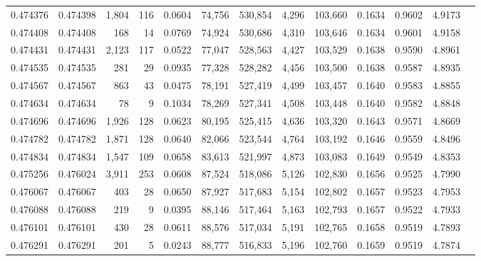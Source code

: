 \begin{tabular}{rrrrrrrrrrrrr}
0.474376 & 0.474398 & 1,804 &   116 &                                     0.0604 &  74,756 & 530,854 &   4,296 & 103,660 & 0.1634 & 0.9602 & 4.9173 \\
0.474408 & 0.474408 &   168 &    14 &                                     0.0769 &  74,924 & 530,686 &   4,310 & 103,646 & 0.1634 & 0.9601 & 4.9158 \\
0.474431 & 0.474431 & 2,123 &   117 &                                     0.0522 &  77,047 & 528,563 &   4,427 & 103,529 & 0.1638 & 0.9590 & 4.8961 \\
0.474535 & 0.474535 &   281 &    29 &                                     0.0935 &  77,328 & 528,282 &   4,456 & 103,500 & 0.1638 & 0.9587 & 4.8935 \\
0.474567 & 0.474567 &   863 &    43 &                                     0.0475 &  78,191 & 527,419 &   4,499 & 103,457 & 0.1640 & 0.9583 & 4.8855 \\
0.474634 & 0.474634 &    78 &     9 &                                     0.1034 &  78,269 & 527,341 &   4,508 & 103,448 & 0.1640 & 0.9582 & 4.8848 \\
0.474696 & 0.474696 & 1,926 &   128 &                                     0.0623 &  80,195 & 525,415 &   4,636 & 103,320 & 0.1643 & 0.9571 & 4.8669 \\
0.474782 & 0.474782 & 1,871 &   128 &                                     0.0640 &  82,066 & 523,544 &   4,764 & 103,192 & 0.1646 & 0.9559 & 4.8496 \\
0.474834 & 0.474834 & 1,547 &   109 &                                     0.0658 &  83,613 & 521,997 &   4,873 & 103,083 & 0.1649 & 0.9549 & 4.8353 \\
0.475256 & 0.476024 & 3,911 &   253 &                                     0.0608 &  87,524 & 518,086 &   5,126 & 102,830 & 0.1656 & 0.9525 & 4.7990 \\
0.476067 & 0.476067 &   403 &    28 &                                     0.0650 &  87,927 & 517,683 &   5,154 & 102,802 & 0.1657 & 0.9523 & 4.7953 \\
0.476088 & 0.476088 &   219 &     9 &                                     0.0395 &  88,146 & 517,464 &   5,163 & 102,793 & 0.1657 & 0.9522 & 4.7933 \\
0.476101 & 0.476101 &   430 &    28 &                                     0.0611 &  88,576 & 517,034 &   5,191 & 102,765 & 0.1658 & 0.9519 & 4.7893 \\
0.476291 & 0.476291 &   201 &     5 &                                     0.0243 &  88,777 & 516,833 &   5,196 & 102,760 & 0.1659 & 0.9519 & 4.7874 \\

\end{tabular}
